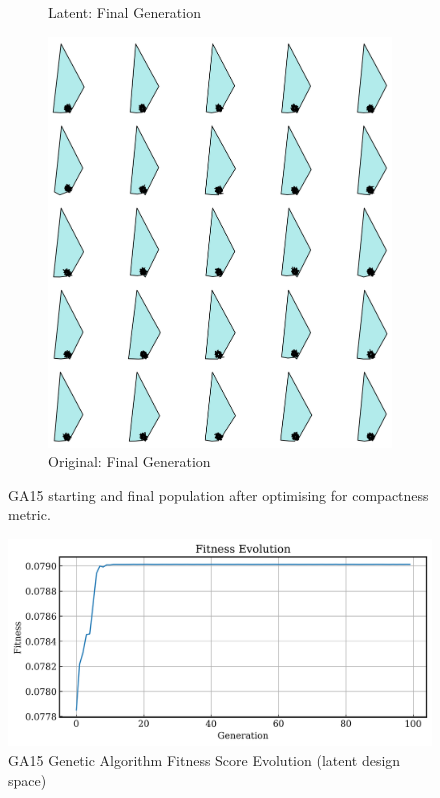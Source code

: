 \documentclass{article}
\begin{document}
\begin{figure}[H]
\begin{subfigure}[b]{0.32\textwidth}
        \caption{Latent: Final Generation}
        \label{fig:GA15_latent_final}
    \end{subfigure}
    \hfill
    \begin{subfigure}[b]{0.32\textwidth}
        \centering
        \includegraphics[width=\textwidth]{figures/GAResults/GA15/original/original_final_gen.png}
        \caption{Original: Final Generation}
        \label{fig:GA15_origina_final}
    \end{subfigure}
    \caption{GA15 starting and final population after optimising for compactness metric.}
    \label{fig:GA15_before_after_GA}
\end{figure}

\begin{figure}[H]
    \centering
    \includegraphics[width=0.75\linewidth]{figures/GAResults/GA15/latent/100gens_10pars_5pcentmut.png}
    \caption{GA15 Genetic Algorithm Fitness Score Evolution (latent design space)}
    \label{fig:GA15_fitness}
\end{figure}
\end{document}
